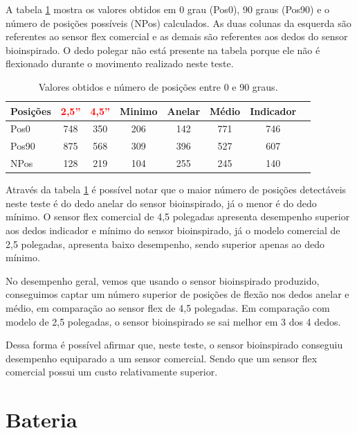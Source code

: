 \documentclass[
	12pt,				%
	openright,			%
	oneside,			%
	a4paper,			%
	english,			%
	brazil				%
	]{abntex2}
\begin{document}
		A tabela \ref{Tab:NPos0-90} mostra os valores obtidos em 0 grau (Pos0), 90 graus (Pos90) e o número de posições possíveis (NPos) calculados. As duas colunas da esquerda são referentes ao sensor flex comercial e as demais são referentes aos dedos do sensor bioinspirado. O dedo polegar não está presente na tabela porque ele não é flexionado durante o movimento realizado neste teste.
		
		\begin{table}[H]
  	\centering
		\caption{Valores obtidos e número de posições entre 0 e 90 graus.}
    \begin{tabular}{l|ccccccc}
      \midrule
			Posições&\textcolor{red}{2,5''}	&\textcolor{red}{4,5''}	& Minimo	& Anelar	& Médio	&	Indicador	\\
      \midrule
			Pos0 		& 748 									& 350 									& 206 		&	142			&	771		&	746				\\
			Pos90 	& 875 									& 568 									& 309 		&	396			&	527		&	607				\\
			NPos 		& 128 									& 219 									& 104 		&	255			&	245		&	140				\\
      \midrule
    \end{tabular}
		\label{Tab:NPos0-90}
		\end{table}

		Através da tabela \ref{Tab:NPos0-90} é possível notar que o maior número de posições detectáveis neste teste é do dedo anelar do sensor bioinspirado, já o menor é do dedo mínimo. O sensor flex comercial de 4,5 polegadas apresenta desempenho superior aos dedos indicador e mínimo do sensor bioinspirado, já o modelo comercial de 2,5 polegadas, apresenta baixo desempenho, sendo superior apenas ao dedo mínimo.

		No desempenho geral, vemos que usando o sensor bioinspirado produzido, conseguimos captar um número superior de posições de flexão nos dedos anelar e médio, em comparação ao sensor flex de 4,5 polegadas. Em comparação com modelo de 2,5 polegadas, o sensor bioinspirado se sai melhor em 3 dos 4 dedos.

		Dessa forma é possível afirmar que, neste teste, o sensor bioinspirado conseguiu desempenho equiparado a um sensor comercial. Sendo que um sensor flex comercial possui um custo relativamente superior.




			\section{Bateria}
\end{document}
